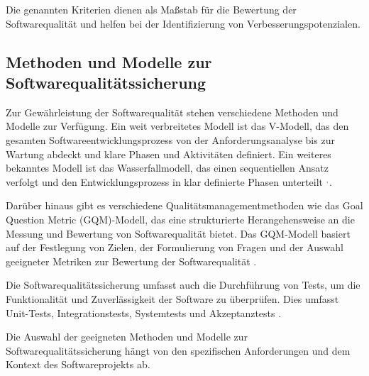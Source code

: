 Die genannten Kriterien dienen als Maßstab für die Bewertung der Softwarequalität und helfen bei der Identifizierung von Verbesserungspotenzialen.

\subsection{Methoden und Modelle zur Softwarequalitätssicherung}
Zur Gewährleistung der Softwarequalität stehen verschiedene Methoden und Modelle zur Verfügung. Ein weit verbreitetes Modell ist das V-Modell, das den gesamten Softwareentwicklungsprozess von der Anforderungsanalyse bis zur Wartung abdeckt und klare Phasen und Aktivitäten definiert. Ein weiteres bekanntes Modell ist das Wasserfallmodell, das einen sequentiellen Ansatz verfolgt und den Entwicklungsprozess in klar definierte Phasen unterteilt $^{,\hspace{1pt}}$.

Darüber hinaus gibt es verschiedene Qualitätsmanagementmethoden wie das Goal Question Metric (GQM)-Modell, das eine strukturierte Herangehensweise an die Messung und Bewertung von Softwarequalität bietet. Das GQM-Modell basiert auf der Festlegung von Zielen, der Formulierung von Fragen und der Auswahl geeigneter Metriken zur Bewertung der Softwarequalität .

Die Softwarequalitätssicherung umfasst auch die Durchführung von Tests, um die Funktionalität und Zuverlässigkeit der Software zu überprüfen. Dies umfasst Unit-Tests, Integrationstests, Systemtests und Akzeptanztests .

Die Auswahl der geeigneten Methoden und Modelle zur Softwarequalitätssicherung hängt von den spezifischen Anforderungen und dem Kontext des Softwareprojekts ab.